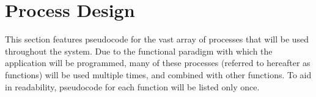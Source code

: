 \section{Process Design}
This section features pseudocode for the vast array of processes that will be used throughout the system. Due to the functional paradigm with which the application will be programmed, many of these processes (referred to hereafter as functions) will be used multiple times, and combined with other functions. To aid in readability, pseudocode for each function will be listed only once.





